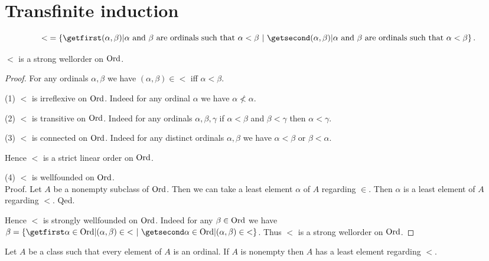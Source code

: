 \documentclass[../set-theory.tex]{subfiles}
\begin{document}
  \section{Transfinite induction}

  \begin{forthel}
    \begin{definition}\label{SET_THEORY_15_4059354166722560}
      \[ {<} = \class{(\alpha, \beta) | \text{$\alpha$ and $\beta$ are ordinals
      such that $\alpha < \beta$}}. \]
    \end{definition}
  \end{forthel}

  \begin{forthel}
    \begin{proposition}\label{SET_THEORY_15_4859038791630848}
      ${<}$ is a strong wellorder on $\mathrm{Ord}$.
    \end{proposition}
    \begin{proof}
      For any ordinals $\alpha, \beta$ we have $(\alpha,\beta) \in {<}$ iff
      $\alpha < \beta$.

      (1) ${<}$ is irreflexive on $\mathrm{Ord}$.
      Indeed for any ordinal $\alpha$ we have $\alpha \nless \alpha$.

      (2) ${<}$ is transitive on $\mathrm{Ord}$.
      Indeed for any ordinals $\alpha, \beta, \gamma$ if $\alpha < \beta$ and
      $\beta < \gamma$ then $\alpha < \gamma$.

      (3) ${<}$ is connected on $\mathrm{Ord}$.
      Indeed for any distinct ordinals $\alpha, \beta$ we have $\alpha < \beta$
      or $\beta < \alpha$.

      Hence ${<}$ is a strict linear order on $\mathrm{Ord}$.

      (4) ${<}$ is wellfounded on $\mathrm{Ord}$. \\
      Proof.
        Let $A$ be a nonempty subclass of $\mathrm{Ord}$.
        Then we can take a least element $\alpha$ of $A$ regarding $\in$.
        Then $\alpha$ is a least element of $A$ regarding ${<}$.
      Qed.

      Hence ${<}$ is strongly wellfounded on $\mathrm{Ord}$.
      Indeed for any $\beta \in \mathrm{Ord}$ we have $\beta = \class{\alpha \in \Ord |
      (\alpha,\beta) \in {<}}$.
      Thus ${<}$ is a strong wellorder on $\mathrm{Ord}$.
    \end{proof}
  \end{forthel}

  \begin{forthel}
    \begin{corollary}\label{SET_THEORY_15_1042046129274880}
      Let $A$ be a class such that every element of $A$ is an ordinal.
      If $A$ is nonempty then $A$ has a least element regarding ${<}$.
    \end{corollary}
  \end{forthel}
\end{document}
